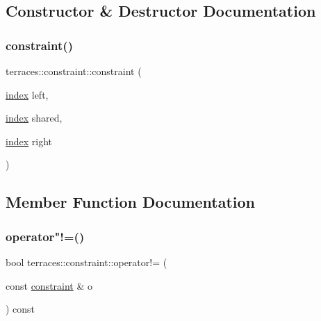 \subsection{Constructor \& Destructor Documentation}
\mbox{\label{structterraces_1_1constraint_a6720264dc0ff93da5d69f3465239b070}} 
\subsubsection{\texorpdfstring{constraint()}{constraint()}}
{\footnotesize\ttfamily terraces\+::constraint\+::constraint (\begin{DoxyParamCaption}\item[{\hyperlink{namespaceterraces_adbc33ccb543d1634e96d0eb02e472c77}{index}}]{left,  }\item[{\hyperlink{namespaceterraces_adbc33ccb543d1634e96d0eb02e472c77}{index}}]{shared,  }\item[{\hyperlink{namespaceterraces_adbc33ccb543d1634e96d0eb02e472c77}{index}}]{right }\end{DoxyParamCaption})\hspace{0.3cm}{\ttfamily [inline]}}



\subsection{Member Function Documentation}
\mbox{\label{structterraces_1_1constraint_afa53046f3ebfbc0855747647baec02c9}} 
\subsubsection{\texorpdfstring{operator"!=()}{operator!=()}}
{\footnotesize\ttfamily bool terraces\+::constraint\+::operator!= (\begin{DoxyParamCaption}\item[{const \hyperlink{structterraces_1_1constraint}{constraint} \&}]{o }\end{DoxyParamCaption}) const\hspace{0.3cm}{\ttfamily [inline]}}


